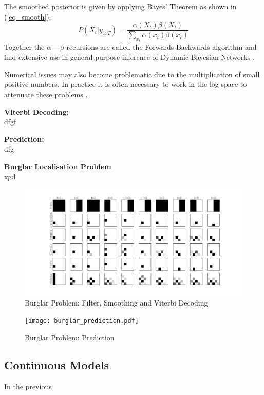 \documentclass[../masters.tex]{subfiles}
\begin{document}
The smoothed posterior is given by applying Bayes' Theorem as shown in (\ref{eq_smooth}).
\begin{equation}
P(X_t|y_{1:T}) = \frac{\alpha(X_t)\beta(X_t)}{\sum_{x_t}\alpha(x_t)\beta(x_t)}
\label{eq_smooth}
\end{equation}
Together the $\alpha - \beta$ recursions are called the Forwards-Backwards algorithm and find extensive use in general purpose inference of Dynamic Bayesian Networks \cite{murphy1}.

Numerical issues may also become problematic due to the multiplication of small positive numbers. In practice it is often necessary to work in the log space to attenuate these problems \cite{barber}. 

\textbf{Viterbi Decoding:} \\
dfgf


\textbf{Prediction:} \\
dfg

\textbf{Burglar Localisation Problem} \\
xgd
\begin{figure}[H] 
\centering
\includegraphics[scale=0.30]{burglar_inference.pdf}
\caption{Burglar Problem: Filter, Smoothing and Viterbi Decoding}
\label{fig_burglar_inference}
\end{figure}

\begin{figure}[H] 
\centering
\texttt{[image: burglar\_prediction.pdf]}
\caption{Burglar Problem: Prediction}
\label{fig_burlgar_prediction}
\end{figure}


\subsection{Continuous Models}
In the previous



\end{document}
